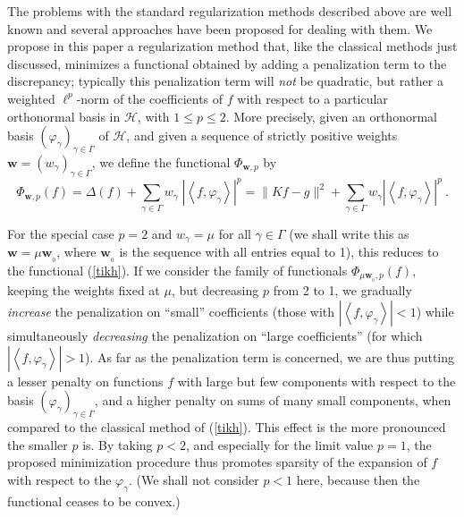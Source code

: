 \documentclass[10pt]{article}
\def\cH{\mathcal{H}}
\def\ag{w_{\gamma}}
\def\vpg{\varphi_{\gamma}}
\newcommand\eref[1]{(\ref{#1})}
\begin{document}
The problems with the standard regularization methods described above
are well known and several approaches have been proposed for dealing
with them.
We propose in this paper a regularization method that, like the classical
methods just discussed, minimizes a functional obtained by adding a
penalization term
to the discrepancy; typically this penalization term will {\em not} be
quadratic,
but rather a weighted $\ell^p$-norm of the coefficients of $f$ with respect to
a particular orthonormal basis in $\cH$, with $1\leq p\leq 2$. More precisely,
given an orthonormal basis $\left(\vpg\right)_{\gamma\in \Gamma}$
of $\cH$, and given a sequence of strictly positive weights
${\mathbf w}= (\ag )_{\gamma\in \Gamma}$,
we define the functional $\Phi_{\mathbf{w},p}$ by
\begin{equation}
\label{funct-gen}
\Phi_{\mathbf{w},p}(f)= \Delta(f)
+\sum_{\gamma \in \Gamma} \ag\; |\left<f,\vpg\right>|^p
= \|Kf-g\|^2 +\sum_{\gamma \in \Gamma} \ag |\left<f,\vpg\right>|^p ~.
\end{equation}

For the special case $p=2$ and $\ag=\mu$ for all $\gamma \in \Gamma$
(we shall write this as $\mathbf{w}= \mu \mathbf{w}_{_0}$, where
$\mathbf{w}_{_0}$ is the sequence with all entries equal to 1),
this reduces
to the functional \eref{tikh}.  If we consider the family of functionals
$\Phi_{\mu\mathbf{w}_{_0},p}(f)$, keeping the weights
fixed at $\mu$, but decreasing $p$ from 2 to 1, we gradually
{\em increase} the penalization
on ``small'' coefficients (those with $|\left<f,\vpg\right>| <1$)
while simultaneously {\em decreasing} the
penalization on ``large coefficients'' (for which
$|\left<f,\vpg\right>|>1$).  As far as the
penalization term is concerned,  we are thus putting a lesser penalty on
functions $f$
with large but few components with respect to the basis
$\left(\vpg\right)_{\gamma\in \Gamma}$, and a higher penalty on
sums of many small components, when compared to the classical method of
\eref{tikh}.
This effect is the more pronounced the
smaller $p$ is. By taking $p <2$, and especially
for the limit value $p=1$,
the proposed minimization procedure thus promotes
sparsity of the expansion of $f$ with respect
to the $\vpg$.
(We shall not consider $p < 1$ here,
because then the functional
ceases to be convex.)
\end{document}
